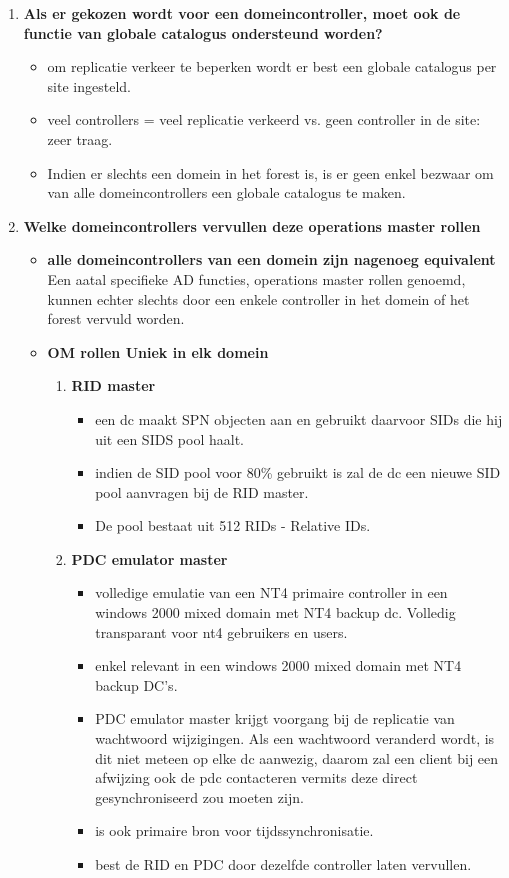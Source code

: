 \begin{enumerate}
\item \textbf{Als er gekozen wordt voor een domeincontroller, moet ook de functie van globale catalogus ondersteund worden?}
\begin{itemize}
\item om replicatie verkeer te beperken wordt er best een globale catalogus per site ingesteld.
\item veel controllers = veel replicatie verkeerd vs. geen controller in de site: zeer traag.
\item Indien er slechts een domein in het forest is, is er geen enkel bezwaar om van alle domeincontrollers een globale catalogus te maken.
\end{itemize}

\item \textbf{Welke domeincontrollers vervullen deze operations master rollen}
\begin{itemize}
\item \textbf{alle domeincontrollers van een domein zijn nagenoeg equivalent} Een aatal specifieke AD functies, operations master rollen genoemd, kunnen echter slechts door een enkele controller in het domein of het forest vervuld worden. 

\item \textbf{OM rollen Uniek in elk domein}
\begin{enumerate}
\item \textbf{RID master}
\begin{itemize}
\item een dc maakt SPN objecten aan en gebruikt daarvoor SIDs die hij uit een SIDS pool haalt.
\item indien de SID pool voor 80\% gebruikt is zal de dc een nieuwe SID pool aanvragen bij de RID master.
\item De pool bestaat uit 512 RIDs - Relative IDs.
\end{itemize}

\item \textbf{PDC emulator master}
\begin{itemize}
\item volledige emulatie van een NT4 primaire controller in een windows 2000 mixed domain met NT4 backup dc. Volledig transparant voor nt4 gebruikers en users.
\item enkel relevant in een windows 2000 mixed domain met NT4 backup DC's.
\item PDC emulator master krijgt voorgang bij de replicatie van wachtwoord wijzigingen. Als een wachtwoord veranderd wordt, is dit niet meteen op elke dc aanwezig, daarom zal een client bij een afwijzing ook de pdc contacteren vermits deze direct gesynchroniseerd zou moeten zijn.
\item is ook primaire bron voor tijdssynchronisatie.
\item best de RID en PDC door dezelfde controller laten vervullen.
\end{itemize}


\end{enumerate}
\end{itemize}
\end{enumerate}
